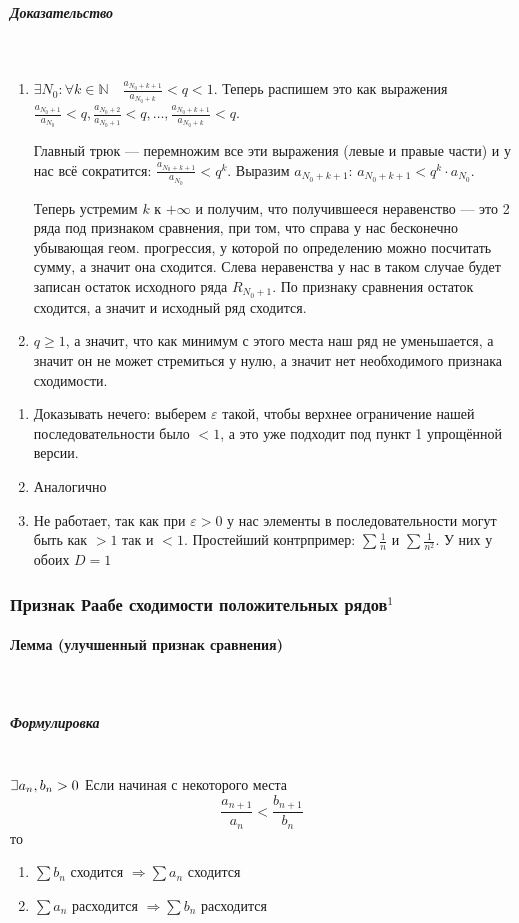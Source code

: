 \documentclass{article}
\def\letus{%
\mathord{\setbox0=\hbox{$\exists$}%
         \hbox{\kern 0.125\wd0%
               \vbox to \ht0{%
                  \hrule width 0.75\wd0%
                  \vfill%
                  \hrule width 0.75\wd0}%
               \vrule height \ht0%
               \kern 0.125\wd0}%
       }%
        }
\let\vanillaparagraph\paragraph
\let\vanillasubparagraph\subparagraph
\renewcommand{\paragraph}[1]{\vanillaparagraph{#1}\mbox{}\\}
\renewcommand{\subparagraph}[1]{\vanillasubparagraph{#1}\mbox{}\\}
\begin{document}
\subparagraph{Доказательство}
\begin{enumerate}
    \item $\exists N_0 : \forall k \in \mathbb{N} \quad \frac{a_{N_0 + k + 1}}{a_{N_0 + k}} < q < 1$. Теперь распишем это как выражения $\frac{a_{N_0 + 1}}{a_{N_0}} < q, \frac{a_{N_0 + 2}}{a_{N_0 + 1}} < q, \ldots, \frac{a_{N_0 + k + 1}}{a_{N_0 + k}} < q$. 
    
    Главный трюк --- перемножим все эти выражения (левые и правые части) и у нас всё сократится: $\frac{a_{N_0+k+1}}{a_{N_0}} < q^k$. Выразим $a_{N_0 + k + 1}$: $a_{N_0 + k + 1} < q^k \cdot a_{N_0}$.
    
    Теперь устремим $k$ к $+\infty$ и получим, что получившееся неравенство --- это 2 ряда под признаком сравнения, при том, что справа у нас бесконечно убывающая геом. прогрессия, у которой по определению можно посчитать сумму, а значит она сходится. Слева неравенства у нас в таком случае будет записан остаток исходного ряда $R_{N_0 + 1}$. По признаку сравнения остаток сходится, а значит и исходный ряд сходится. 
    
    \item $q \ge 1$, а значит, что как минимум с этого места наш ряд не уменьшается, а значит он не может стремиться у нулю, а значит нет необходимого признака сходимости.
\end{enumerate}
\begin{enumerate}
    \item Доказывать нечего: выберем $\varepsilon$ такой, чтобы верхнее ограничение нашей последовательности было $< 1$, а это уже подходит под пункт 1 упрощённой версии.
    \item Аналогично
    \item Не работает, так как при $\varepsilon > 0$ у нас элементы в последовательности могут быть как $>1$ так и $<1$. Простейший контрпример: $\sum \frac{1}{n}$ и $\sum \frac{1}{n^2}$. У них у обоих $D = 1$
\end{enumerate}

\subsubsection{Признак Раабе сходимости положительных рядов\texorpdfstring{$^1$}{}}
\paragraph{Лемма (улучшенный признак сравнения)}
\subparagraph{Формулировка}
$\letus a_n, b_n > 0$
Если начиная с некоторого места
$$
\frac{a_{n+1}}{a_n} < \frac{b_{n+1}}{b_n}
$$
то
\begin{enumerate}
    \item $\sum b_n$ сходится $\Rightarrow \sum a_n$ сходится
    \item $\sum a_n$ расходится $\Rightarrow \sum b_n$ расходится
\end{enumerate}
\end{document}
